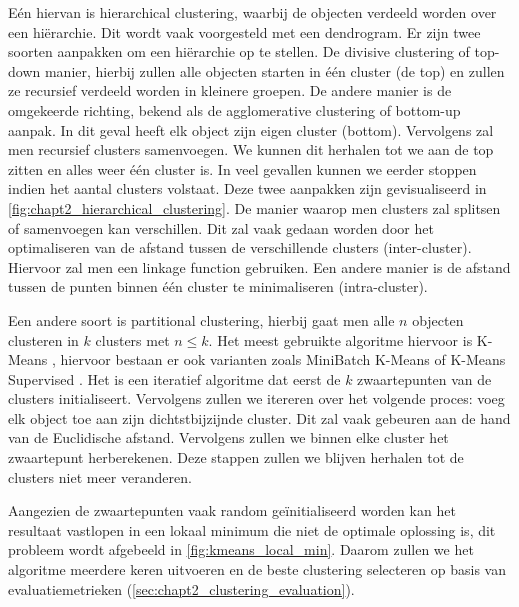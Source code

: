 Eén hiervan is hierarchical clustering, waarbij de objecten verdeeld worden over een hiërarchie. Dit wordt vaak voorgesteld met een dendrogram. Er zijn twee soorten aanpakken om een hiërarchie op te stellen. De divisive clustering of top-down manier, hierbij zullen alle objecten starten in één cluster (de top) en zullen ze recursief verdeeld worden in kleinere groepen. De andere manier is de omgekeerde richting, bekend als de agglomerative clustering of bottom-up aanpak. In dit geval heeft elk object zijn eigen cluster (bottom). Vervolgens zal men recursief clusters samenvoegen. We kunnen dit herhalen tot we aan de top zitten en alles weer één cluster is. In veel gevallen kunnen we eerder stoppen indien het aantal clusters volstaat. Deze twee aanpakken zijn gevisualiseerd in \autoref{fig:chapt2_hierarchical_clustering}.
\newline De manier waarop men clusters zal splitsen of samenvoegen kan verschillen. Dit zal vaak gedaan worden door het optimaliseren van de afstand tussen de verschillende clusters (inter-cluster). Hiervoor zal men een linkage function gebruiken. Een andere manier is de afstand tussen de punten binnen één cluster te minimaliseren (intra-cluster).


Een andere soort is partitional clustering, hierbij gaat men alle $n$ objecten clusteren in $k$ clusters met $ n \leq k $. Het meest gebruikte algoritme hiervoor is K-Means \cite{kmeans_wiki}, hiervoor bestaan er ook varianten zoals MiniBatch K-Means \cite{kmeans_minibatch} of K-Means Supervised \cite{kmeans_supervised}. Het is een iteratief algoritme dat eerst de $k$ zwaartepunten van de clusters initialiseert. Vervolgens zullen we itereren over het volgende proces: voeg elk object toe aan zijn dichtstbijzijnde cluster. Dit zal vaak gebeuren aan de hand van de Euclidische afstand. Vervolgens zullen we binnen elke cluster het zwaartepunt herberekenen. Deze stappen zullen we blijven herhalen tot de clusters niet meer veranderen.

Aangezien de zwaartepunten vaak random geïnitialiseerd worden kan het resultaat vastlopen in een lokaal minimum die niet de optimale oplossing is, dit probleem wordt afgebeeld in \autoref{fig:kmeans_local_min}. Daarom zullen we het algoritme meerdere keren uitvoeren en de beste clustering selecteren op basis van evaluatiemetrieken (\autoref{sec:chapt2_clustering_evaluation}).

